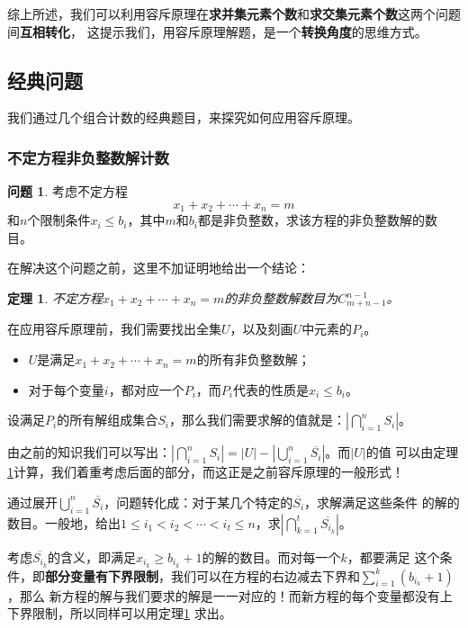 \documentclass{noithesis}
\theoremstyle{plain}      \newtheorem{theorem}{定理}[subsection]
\theoremstyle{definition} \newtheorem{problem}{问题}[subsection]
\begin{document}
综上所述，我们可以利用容斥原理在\textbf{求并集元素个数}和\textbf{求交集元素个数}这两个问题间\textbf{互相转化}，
这提示我们，用容斥原理解题，是一个\textbf{转换角度}的思维方式。

\subsection{经典问题}

我们通过几个组合计数的经典题目，来探究如何应用容斥原理。

\subsubsection{不定方程非负整数解计数}

\begin{problem}
考虑不定方程
\[
x_1+x_2+\cdots+x_n=m
\]
和$n$个限制条件$x_i \le b_i$，其中$m$和$b_i$都是非负整数，求该方程的非负整数解的数目。
\end{problem}
\par

在解决这个问题之前，这里不加证明地给出一个结论：
\begin{theorem} \label{theorem:eqsol}
不定方程$x_1+x_2+\cdots+x_n=m$的非负整数解数目为$C_{m+n-1}^{n-1}$。
\end{theorem}
\par

在应用容斥原理前，我们需要找出全集$U$，以及刻画$U$中元素的$P_i$。
\begin{itemize}
\item $U$是满足$x_1+x_2+\cdots+x_n=m$的所有非负整数解；
\item 对于每个变量$i$，都对应一个$P_i$，而$P_i$代表的性质是$x_i \le b_i$。
\end{itemize}
设满足$P_i$的所有解组成集合$S_i$，那么我们需要求解的值就是：$|\bigcap_{i=1}^n{S_i}|$。 \par

由之前的知识我们可以写出：$|\bigcap_{i=1}^n{S_i}|=|U|-|\bigcup_{i=1}^n{\overline{S_i}}|$。而$|U|$的值
可以由定理\ref{theorem:eqsol}计算，我们着重考虑后面的部分，而这正是之前容斥原理的一般形式！ \par

通过展开$\bigcup_{i=1}^n{\overline{S_i}}$，问题转化成：对于某几个特定的$\overline{S_i}$，求解满足这些条件
的解的数目。一般地，给出$1 \le i_1 < i_2 < \cdots < i_t \le n$，求$|\bigcap_{k=1}^t{\overline{S_{i_k}}}|$。 \par

考虑$\overline{S_{i_k}}$的含义，即满足$x_{i_k} \ge b_{i_k} + 1$的解的数目。而对每一个$k$，都要满足
这个条件，即\textbf{部分变量有下界限制}，我们可以在方程的右边减去下界和$\sum_{i=1}^k{(b_{i_k}+1)}$，那么
新方程的解与我们要求的解是一一对应的！而新方程的每个变量都没有上下界限制，所以同样可以用定理\ref{theorem:eqsol}
求出。 \par
\end{document}
